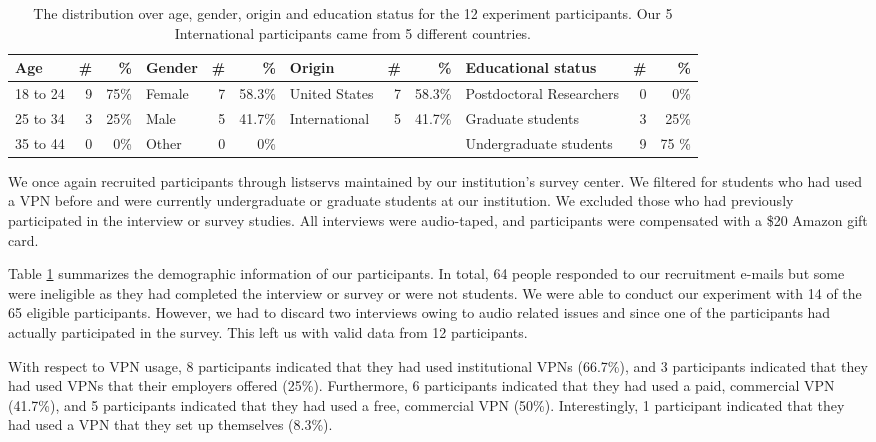 \begin{table}[h!]
\centering
\begin{tabular}{l r r |l r r|l r r|l r r} 
 \hline
 Age & \# & \% & Gender & \# & \% & Origin & \# & \% & Educational status & \# & \% \\
\hline
18 to 24 & 9 & 75\% & Female & 7 & 58.3\% & United States & 7 & 58.3\% & Postdoctoral Researchers & 0 & 0\% \\
25 to 34 & 3 & 25\% & Male & 5 & 41.7\% & International & 5 & 41.7\% & Graduate students & 3 & 25\% \\
35 to 44 & 0 & 0\% & Other & 0 & 0\% & & & & Undergraduate students & 9 & 75 \% \\
 \hline
\end{tabular}
\caption{The distribution over age, gender, origin and education status for the 12 experiment participants. Our 5 International participants came from 5 different countries.}
\label{tab:experiment_demo}
\end{table}

We once again recruited participants through listservs maintained by our
institution's survey center.  We filtered for students who had used a VPN
before and were
currently undergraduate or graduate students at our institution. We excluded those who had previously participated in the interview or survey studies.  All
interviews were audio-taped, and participants were compensated with a \$20
Amazon gift card.

Table \ref{tab:experiment_demo} summarizes the demographic information of our participants. In total, 64 people responded to our recruitment e-mails but some were
ineligible as they had completed the interview or survey or were not students.
We were able to conduct our experiment with 14 of the 65 eligible
participants.  However, we had to discard two interviews owing to audio
related issues and since one of the participants had actually participated in
the survey.  This left us with valid data from 12 participants.

With respect to VPN usage, 8 participants indicated that they had used institutional VPNs (66.7\%), and 3 participants indicated that they had used VPNs that their employers offered (25\%).
Furthermore, 6 participants indicated that they had used a paid, commercial VPN (41.7\%), and 5 participants indicated that they had used a free, commercial VPN (50\%).
Interestingly, 1 participant indicated that they had used a VPN that they set up themselves (8.3\%).

